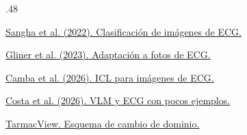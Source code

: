 {\begin{frame}[t]
\begin{columns}[T,onlytextwidth]
\begin{column}{.48\textwidth}
{\href{https://pmc.ncbi.nlm.nih.gov/articles/PMC8948243/}{Sangha et al. (2022). Clasificación de imágenes de ECG.}\par\vspace{2mm}
\href{https://pmc.ncbi.nlm.nih.gov/articles/PMC10462630/}{Gliner et al. (2023). Adaptación a fotos de ECG.}\par\vspace{2mm}
\href{https://portalinvestigacion.uniovi.es/documentos/697e9dda4f95b66d0e7b373a?lang=en}{Camba et al. (2026). ICL para imágenes de ECG.}\par\vspace{2mm}
\href{https://pubmed.ncbi.nlm.nih.gov/42330857/}{Costa et al. (2026). VLM y ECG con pocos ejemplos.}\par\vspace{2mm}
\href{https://www.tarmacview.com/es/glossary/domain-adaptation/}{TarmacView. Esquema de cambio de dominio.}\par}
\end{column}
\end{columns}
\end{frame}}

